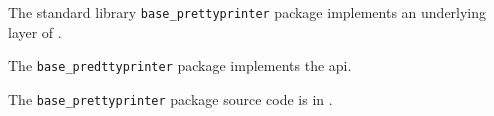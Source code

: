 
The standard library {\tt base\_prettyprinter} package implements an underlying layer of .

The {\tt base\_predttyprinter} package implements the  api.

The {\tt base\_prettyprinter} package source code is in .




